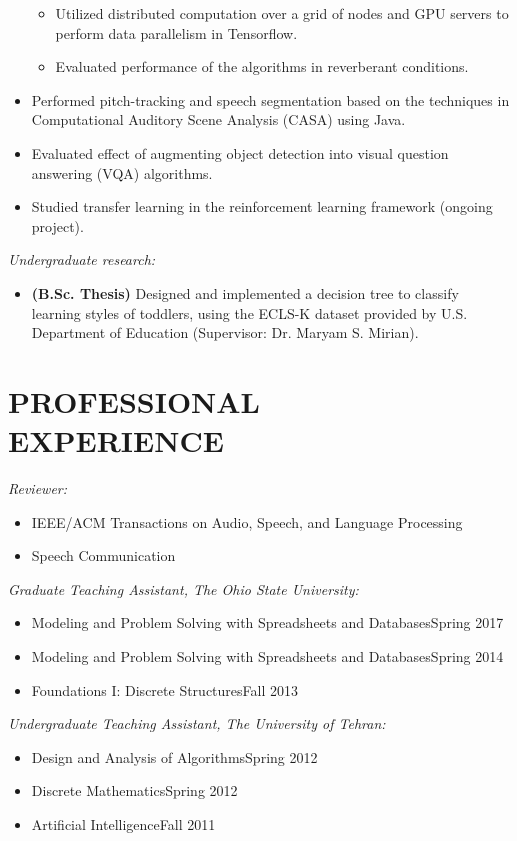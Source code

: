 \documentclass[margin, 10pt]{res}
\begin{document}
\begin{resume}
\begin{itemize}
\begin{itemize}
	\item Utilized distributed computation over a grid of nodes and GPU servers to perform data parallelism in Tensorflow.
	\item Evaluated performance of the algorithms in reverberant conditions.
	\end{itemize}
\item Performed pitch-tracking and speech segmentation based on the techniques in Computational Auditory Scene Analysis (CASA) using Java.
\item Evaluated effect of augmenting object detection into visual question answering (VQA) algorithms.
\item Studied transfer learning in the reinforcement learning framework (ongoing project).
\end{itemize}
\textit{Undergraduate research:}
\begin{itemize}\setlength\itemsep{-0.3em}
\item \textbf{(B.Sc. Thesis)} Designed and implemented a decision tree to classify learning styles of toddlers, using the ECLS-K dataset provided by U.S. Department of Education (Supervisor: Dr. Maryam S. Mirian).
\end{itemize}
\section{PROFESSIONAL\\EXPERIENCE}
\textit{Reviewer:}
\begin{itemize}\setlength\itemsep{-0.3em}
\item IEEE/ACM Transactions on Audio, Speech, and Language Processing
\item Speech Communication
\end{itemize}
\textit{Graduate Teaching Assistant, The Ohio State University:}
\begin{itemize}\setlength\itemsep{-0.3em}
\item Modeling and Problem Solving with Spreadsheets and Databases\hfill {\footnotesize Spring 2017}
\item Modeling and Problem Solving with Spreadsheets and Databases\hfill {\footnotesize Spring 2014}
\item Foundations I: Discrete Structures\hfill {\footnotesize Fall 2013}
\end{itemize}
\textit{Undergraduate Teaching Assistant, The University of Tehran:}
\begin{itemize}\setlength\itemsep{-0.3em}
\item Design and Analysis of Algorithms\hfill {\footnotesize Spring 2012}
\item Discrete Mathematics\hfill {\footnotesize Spring 2012}
\item Artificial Intelligence\hfill {\footnotesize Fall 2011}
\end{itemize}


\end{resume}
\end{document}
